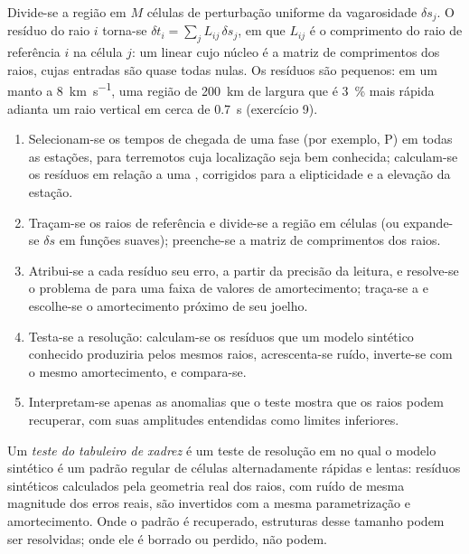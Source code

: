 Divide-se a região em $M$ células de perturbação uniforme da vagarosidade $\delta s_j$.
O resíduo do raio $i$ torna-se $\delta t_i = \sum_j L_{ij}\,\delta s_j$, em que
$L_{ij}$ é o comprimento do raio de referência $i$ na célula $j$: um  linear
cujo núcleo é a matriz de comprimentos dos raios, cujas entradas são quase todas
nulas. Os resíduos são pequenos: em um manto a
\qty{8}{km.s^{-1}}, uma região de \qty{200}{km} de largura que é \qty{3}{\percent}
mais rápida adianta um raio vertical em cerca de \qty{0.7}{s} (exercício 9).

\begin{method}\label{met:b3:seismology-imaging:tomo}
\begin{enumerate}
  \item Selecionam-se os tempos de chegada de uma fase (por exemplo, P) em todas as estações, para
        terremotos cuja localização seja bem conhecida; calculam-se os resíduos
        em relação a uma , corrigidos para a elipticidade e a elevação da
        estação.
  \item Traçam-se os raios de referência e divide-se a região em células (ou expande-se
        $\delta s$ em funções suaves); preenche-se a matriz de comprimentos dos raios.
  \item Atribui-se a cada resíduo seu erro, a partir da precisão da leitura, e resolve-se
        o problema de  para uma faixa de valores de amortecimento; traça-se
        a  e escolhe-se o amortecimento próximo de seu joelho.
  \item Testa-se a resolução: calculam-se os resíduos que um modelo sintético conhecido
        produziria pelos mesmos raios, acrescenta-se ruído, inverte-se com o
        mesmo amortecimento, e compara-se.
  \item Interpretam-se apenas as anomalias que o teste mostra que os raios podem
        recuperar, com suas amplitudes entendidas como limites inferiores.
\end{enumerate}
\end{method}

\begin{definition}\label{def:b3:seismology-imaging:checkerboard}
Um \emph{teste do tabuleiro de xadrez} é um teste de resolução em
no qual o modelo sintético é um padrão regular de células alternadamente rápidas e lentas:
resíduos sintéticos calculados pela geometria real dos raios, com ruído
de mesma magnitude dos erros reais, são invertidos com a mesma parametrização e
amortecimento. Onde o padrão é recuperado, estruturas desse tamanho podem ser
resolvidas; onde ele é borrado ou perdido, não podem.
\end{definition}

